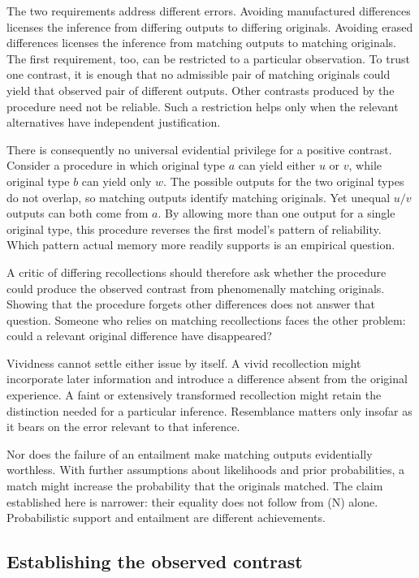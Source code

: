 The two requirements address different errors. Avoiding manufactured differences licenses the inference from differing outputs to differing originals. Avoiding erased differences licenses the inference from matching outputs to matching originals. The first requirement, too, can be restricted to a particular observation. To trust one contrast, it is enough that no admissible pair of matching originals could yield that observed pair of different outputs. Other contrasts produced by the procedure need not be reliable. Such a restriction helps only when the relevant alternatives have independent justification.

There is consequently no universal evidential privilege for a positive contrast. Consider a procedure in which original type \(a\) can yield either \(u\) or \(v\), while original type \(b\) can yield only \(w\). The possible outputs for the two original types do not overlap, so matching outputs identify matching originals. Yet unequal \(u/v\) outputs can both come from \(a\). By allowing more than one output for a single original type, this procedure reverses the first model's pattern of reliability. Which pattern actual memory more readily supports is an empirical question.

A critic of differing recollections should therefore ask whether the procedure could produce the observed contrast from phenomenally matching originals. Showing that the procedure forgets other differences does not answer that question. Someone who relies on matching recollections faces the other problem: could a relevant original difference have disappeared?

Vividness cannot settle either issue by itself. A vivid recollection might incorporate later information and introduce a difference absent from the original experience. A faint or extensively transformed recollection might retain the distinction needed for a particular inference. Resemblance matters only insofar as it bears on the error relevant to that inference.

Nor does the failure of an entailment make matching outputs evidentially worthless. With further assumptions about likelihoods and prior probabilities, a match might increase the probability that the originals matched. The claim established here is narrower: their equality does not follow from (N) alone. Probabilistic support and entailment are different achievements.

\subsection*{Establishing the observed contrast}


